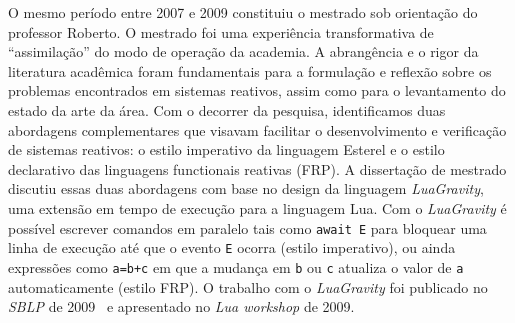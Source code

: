 \documentclass[12pt,a4paper]{article}
\newcommand{\code}[1] {{\small{\texttt{#1}}}}
\newcommand{\GVT}{\emph{LuaGravity}\xspace}
\begin{document}
O mesmo período entre 2007 e 2009 constituiu o mestrado sob orientação do 
professor Roberto.
%
O mestrado foi uma experiência transformativa de ``assimilação'' do modo de 
operação da academia.
%
A abrangência e o rigor da literatura acadêmica foram fundamentais para a 
formulação e reflexão sobre os problemas encontrados em sistemas reativos, 
assim como para o levantamento do estado da arte da área.
%
Com o decorrer da pesquisa, identificamos duas abordagens complementares que 
visavam facilitar o desenvolvimento e verificação de sistemas reativos:
o estilo imperativo da linguagem Esterel e
o estilo declarativo das linguagens functionais reativas (FRP).
%
A dissertação de mestrado discutiu essas duas abordagens com base no design da 
linguagem \GVT, uma extensão em tempo de execução para a linguagem Lua.
%
Com o \GVT é possível escrever comandos em paralelo tais como \code{await E} 
para bloquear uma linha de execução até que o evento \code{E} ocorra (estilo 
imperativo), ou ainda expressões como \code{a=b+c} em que a mudança em \code{b} 
ou \code{c} atualiza o valor de \code{a} automaticamente (estilo FRP).
%
O trabalho com o \GVT foi publicado no \emph{SBLP} de 
2009~\cite{luagravity.sblp} e apresentado no \emph{Lua workshop} de 2009.
\end{document}
